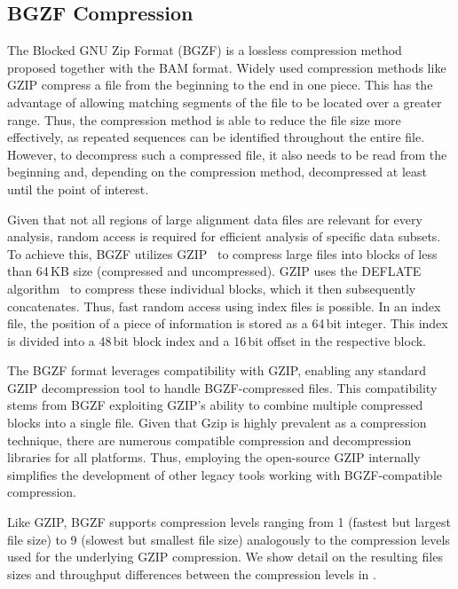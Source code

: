 \subsection{BGZF Compression} \label{bgzf}
The Blocked GNU Zip Format (BGZF) is a lossless compression method proposed together with the BAM format. Widely used compression methods like GZIP compress a file from the beginning to the end in one piece. This has the advantage of allowing matching segments of the file to be located over a greater range. Thus, the compression method is able to reduce the file size more effectively, as repeated sequences can be identified throughout the entire file. However, to decompress such a compressed file, it also needs to be read from the beginning and, depending on the compression method, decompressed at least until the point of interest. 

Given that not all regions of large alignment data files are relevant for every analysis, random access is required for efficient analysis of specific data subsets. To achieve this, BGZF utilizes GZIP~\cite{gzip} to compress large files into blocks of less than 64\,KB size (compressed and uncompressed). GZIP uses the DEFLATE algorithm~\cite{deflate} to compress these individual blocks, which it then subsequently concatenates. Thus, fast random access using index files is possible. In an index file, the position of a piece of information is stored as a 64\,bit integer. This index is divided into a 48\,bit block index and a 16\,bit offset in the respective block.

The BGZF format leverages compatibility with GZIP, enabling any standard GZIP decompression tool to handle BGZF-compressed files. This compatibility stems from BGZF exploiting GZIP's ability to combine multiple compressed blocks into a single file. Given that Gzip is highly prevalent as a compression technique, there are numerous compatible compression and decompression libraries for all platforms. Thus, employing the open-source GZIP internally simplifies the development of other legacy tools working with BGZF-compatible compression.  

Like GZIP, BGZF supports compression levels ranging from 1 (fastest but largest file size) to 9 (slowest but smallest file size) analogously to the compression levels used for the underlying GZIP compression. We show detail on the resulting files sizes and throughput differences between the compression levels in .

